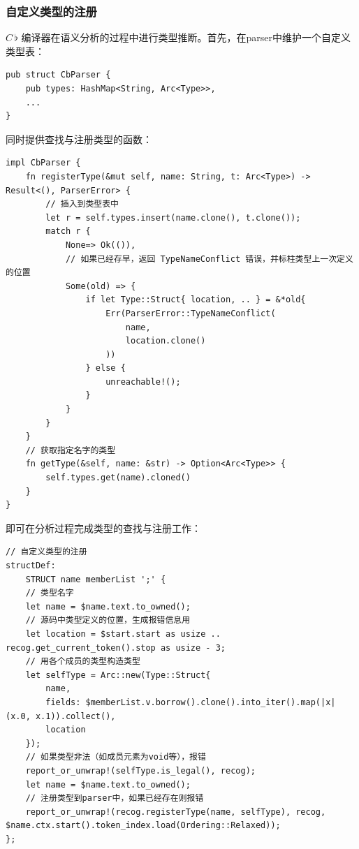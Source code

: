 \documentclass{ctexrep}
\newcommand{\cb}{$C\,\flat$\xspace}
\begin{document}
\subsubsection{自定义类型的注册}

\cb 编译器在语义分析的过程中进行类型推断。首先，在parser中维护一个自定义类型表：
\begin{verbatim}
pub struct CbParser {
    pub types: HashMap<String, Arc<Type>>,
    ...
}
\end{verbatim}
同时提供查找与注册类型的函数：
\begin{verbatim}
impl CbParser {
    fn registerType(&mut self, name: String, t: Arc<Type>) -> Result<(), ParserError> {
        // 插入到类型表中
        let r = self.types.insert(name.clone(), t.clone());
        match r {
            None=> Ok(()),
            // 如果已经存早，返回 TypeNameConflict 错误，并标柱类型上一次定义的位置
            Some(old) => {
                if let Type::Struct{ location, .. } = &*old{
                    Err(ParserError::TypeNameConflict(
                        name,
                        location.clone()
                    ))
                } else {
                    unreachable!();
                }
            }
        }
    }
    // 获取指定名字的类型
    fn getType(&self, name: &str) -> Option<Arc<Type>> {
        self.types.get(name).cloned()
    }
}
\end{verbatim}
即可在分析过程完成类型的查找与注册工作：
\begin{verbatim}
// 自定义类型的注册
structDef:
    STRUCT name memberList ';' {
    // 类型名字
    let name = $name.text.to_owned();
    // 源码中类型定义的位置，生成报错信息用
    let location = $start.start as usize .. recog.get_current_token().stop as usize - 3;
    // 用各个成员的类型构造类型
    let selfType = Arc::new(Type::Struct{
        name, 
        fields: $memberList.v.borrow().clone().into_iter().map(|x| (x.0, x.1)).collect(),
        location
    });
    // 如果类型非法（如成员元素为void等），报错
    report_or_unwrap!(selfType.is_legal(), recog);
    let name = $name.text.to_owned();
    // 注册类型到parser中，如果已经存在则报错
    report_or_unwrap!(recog.registerType(name, selfType), recog, $name.ctx.start().token_index.load(Ordering::Relaxed));
};
\end{verbatim}
\end{document}
